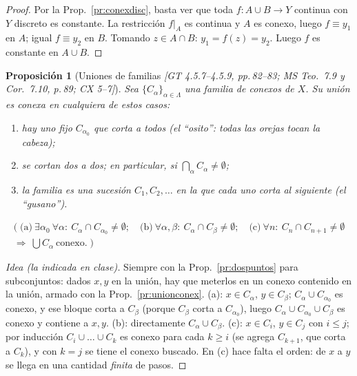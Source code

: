 \documentclass[11pt,a4paper]{article}
\newcommand{\lgc}[1]{\par\vspace{-3pt}\begin{gather*}\big(\;#1\;\big)\end{gather*}\vspace{-6pt}}
\theoremstyle{definition}
\theoremstyle{plain}
\newtheorem{proposicion}[definicion]{Proposición}
\newcommand{\fnt}[1]{{\normalfont\small\itshape\color{gray!150!black}[#1]}}
\begin{document}
\begin{proof}
Por la Prop.~\ref{pr:conexdisc}, basta ver que toda $f:A\cup B\to Y$ continua con $Y$ discreto es constante. La restricción $f|_A$ es continua y $A$ es conexo, luego $f\equiv y_1$ en $A$; igual $f\equiv y_2$ en $B$. Tomando $z\in A\cap B$: $y_1=f(z)=y_2$. Luego $f$ es constante en $A\cup B$.
\end{proof}

\begin{proposicion}[Uniones de familias \fnt{GT 4.5.7--4.5.9, pp.\,82--83; MS Teo.\ 7.9 y Cor.\ 7.10, p.\,89; CX 5--7}]\label{pr:familias}
Sea $\{C_\alpha\}_{\alpha\in\Lambda}$ una familia de conexos de $X$. Su unión es conexa en cualquiera de estos casos:
\begin{enumerate}[label=(\alph*),leftmargin=2.2em,itemsep=0pt]
\item hay uno fijo $C_{\alpha_0}$ que corta a todos (el ``osito'': todas las orejas tocan la cabeza);
\item se cortan dos a dos; en particular, si $\bigcap_\alpha C_\alpha\ne\emptyset$;
\item la familia es una sucesión $C_1,C_2,\dots$ en la que cada uno corta al siguiente (el ``gusano'').
\end{enumerate}
\lgc{\text{(a)}\ \exists\alpha_0\ \forall\alpha:\ C_\alpha\cap C_{\alpha_0}\ne\emptyset;\quad
\text{(b)}\ \forall\alpha,\beta:\ C_\alpha\cap C_\beta\ne\emptyset;\quad
\text{(c)}\ \forall n:\ C_n\cap C_{n+1}\ne\emptyset\\
\Longrightarrow\ \textstyle\bigcup C_\alpha\ \text{conexo}.}
\end{proposicion}

\begin{proof}[Idea (la indicada en clase)]
Siempre con la Prop.~\ref{pr:dospuntos} para subconjuntos: dados $x,y$ en la unión, hay que meterlos en un conexo contenido en la unión, armado con la Prop.~\ref{pr:unionconex}. (a): $x\in C_\alpha$, $y\in C_\beta$; $C_\alpha\cup C_{\alpha_0}$ es conexo, y ese bloque corta a $C_\beta$ (porque $C_\beta$ corta a $C_{\alpha_0}$), luego $C_\alpha\cup C_{\alpha_0}\cup C_\beta$ es conexo y contiene a $x,y$. (b): directamente $C_\alpha\cup C_\beta$. (c): $x\in C_i$, $y\in C_j$ con $i\le j$; por inducción $C_i\cup\dots\cup C_k$ es conexo para cada $k\ge i$ (se agrega $C_{k+1}$, que corta a $C_k$), y con $k=j$ se tiene el conexo buscado. En (c) hace falta el orden: de $x$ a $y$ se llega en una cantidad \emph{finita} de pasos.
\end{proof}
\end{document}
